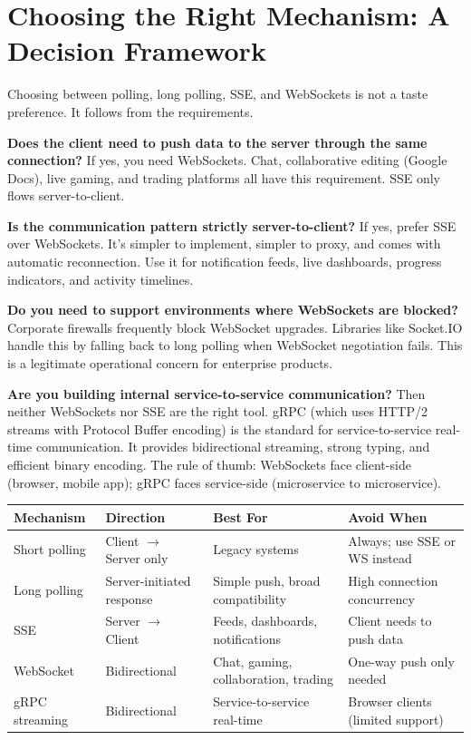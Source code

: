\documentclass[11pt,a4paper]{article}
\begin{document}
\section{Choosing the Right Mechanism: A Decision Framework}

Choosing between polling, long polling, SSE, and WebSockets is not a taste preference. It follows from the requirements.

\textbf{Does the client need to push data to the server through the same connection?} If yes, you need WebSockets. Chat, collaborative editing (Google Docs), live gaming, and trading platforms all have this requirement. SSE only flows server-to-client.

\textbf{Is the communication pattern strictly server-to-client?} If yes, prefer SSE over WebSockets. It's simpler to implement, simpler to proxy, and comes with automatic reconnection. Use it for notification feeds, live dashboards, progress indicators, and activity timelines.

\textbf{Do you need to support environments where WebSockets are blocked?} Corporate firewalls frequently block WebSocket upgrades. Libraries like Socket.IO handle this by falling back to long polling when WebSocket negotiation fails. This is a legitimate operational concern for enterprise products.

\textbf{Are you building internal service-to-service communication?} Then neither WebSockets nor SSE are the right tool. gRPC (which uses HTTP/2 streams with Protocol Buffer encoding) is the standard for service-to-service real-time communication. It provides bidirectional streaming, strong typing, and efficient binary encoding. The rule of thumb: WebSockets face client-side (browser, mobile app); gRPC faces service-side (microservice to microservice).

\begin{tabularx}{\linewidth}{lXXX}
\toprule
\textbf{Mechanism} & \textbf{Direction} & \textbf{Best For} & \textbf{Avoid When} \\
\midrule
Short polling & Client $\to$ Server only & Legacy systems & Always; use SSE or WS instead \\
Long polling & Server-initiated response & Simple push, broad compatibility & High connection concurrency \\
SSE & Server $\to$ Client & Feeds, dashboards, notifications & Client needs to push data \\
WebSocket & Bidirectional & Chat, gaming, collaboration, trading & One-way push only needed \\
gRPC streaming & Bidirectional & Service-to-service real-time & Browser clients (limited support) \\
\bottomrule
\end{tabularx}
\end{document}
